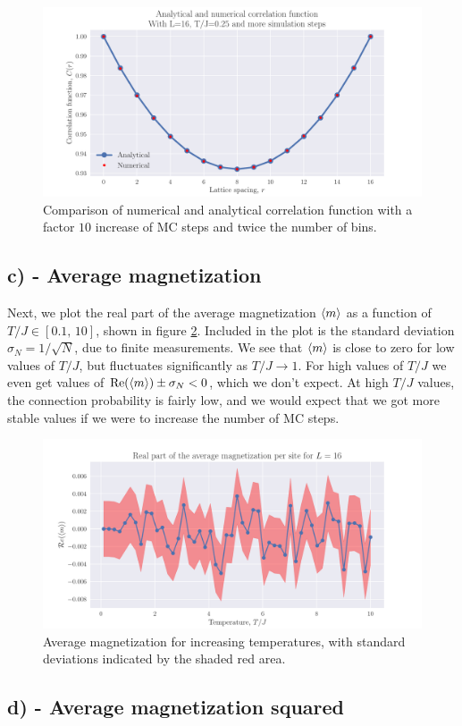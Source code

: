 \documentclass[reprint,english,notitlepage,aps,nobalancelastpage,nofootinbib]{revtex4-1}
\newcommand{\tj}{T/J}
\begin{document}
\begin{figure}[h!]
	\centering
	\includegraphics[width=0.7\linewidth]{correlation1D_025_incrN.pdf}
	\caption{Comparison of numerical and analytical correlation function with a factor $10$ increase of MC steps and twice the number of bins.}
	\label{fig:correlation_incrN}
\end{figure}

\subsection*{c) - Average magnetization}
Next, we plot the real part of the average magnetization $\expval{m}$ as a function of $\tj\in[0.1,\,10]$, shown in figure \ref{fig:avg_mag}. Included in the plot is the standard deviation $\sigma_N=1/\sqrt{N}$, due to finite measurements. We see that $\expval{m}$ is close to zero for low values of $\tj$, but fluctuates significantly as $\tj\to1$. For high values of $\tj$ we even get values of $\Re(\expval{m})\pm\sigma_N<0$, which we don't expect. At high $\tj$ values, the connection probability is fairly low, and we would expect that we got more stable values if we were to increase the number of MC steps.     

\begin{figure}[h!]
	\centering
	\includegraphics[width=0.7\linewidth]{avg_mag_re.pdf}
	\caption{Average magnetization for increasing temperatures, with standard deviations indicated by the shaded red area.}
	\label{fig:avg_mag}
\end{figure}

\subsection*{d) - Average magnetization squared}
\end{document}

